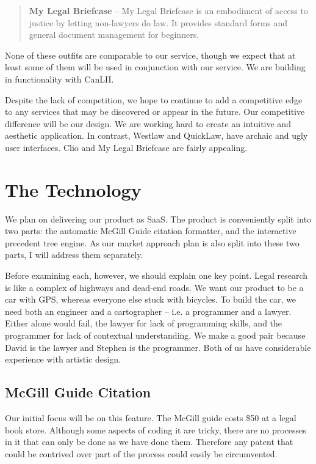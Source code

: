 \documentclass[11pt]{article}
\begin{document}
\begin{quote}
\textbf{My Legal Briefcase} -- My Legal Briefcase is an embodiment of access to justice by letting non-lawyers do law. It provides standard forms and general document management for beginners. 
\end{quote}

None of these outfits are comparable to our service, though we expect that at least some of them will be used in conjunction with our service. We are building in functionality with CanLII. 

Despite the lack of competition, we hope to continue to add a competitive edge to any services that may be discovered or appear in the future. Our competitive difference will be our design. We are working hard to create an intuitive and aesthetic application. In contrast, Westlaw and QuickLaw, have archaic and ugly user interfaces. Clio and My Legal Briefcase are fairly appealing.


\section*{The Technology}

We plan on delivering our product as SaaS. The product is conveniently split into two parts: the automatic McGill Guide citation formatter, and the interactive precedent tree engine. As our market approach plan is also split into these two parts, I will address them separately.

Before examining each, however, we should explain one key point. Legal research is like a complex of highways and dead-end roads. We want our product to be a car with GPS, whereas everyone else stuck with bicycles. To build the car, we need both an engineer and a cartographer -- i.e. a programmer and a lawyer. Either alone would fail, the lawyer for lack of programming skills, and the programmer for lack of contextual understanding. We make a good pair because David is the lawyer and Stephen is the programmer. Both of us have considerable experience with artistic design.



\subsection*{McGill Guide Citation}

Our initial focus will be on this feature. The McGill guide costs \$50 at a legal book store. Although some aspects of coding it are tricky, there are no processes in it that can only be done as we have done them. Therefore any patent that could be contrived over part of the process could easily be circumvented. 
\end{document}
